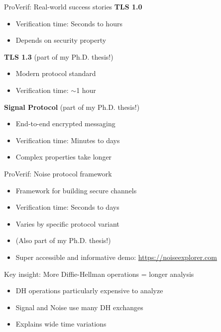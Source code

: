 \documentclass[aspectratio=169, lualatex, handout]{beamer}
\begin{document}
\begin{frame}{ProVerif: Real-world success stories}
	\textbf{TLS 1.0}
	\begin{itemize}
		\item Verification time: Seconds to hours
		\item Depends on security property
	\end{itemize}
	\vspace{0.5em}
	\textbf{TLS 1.3} (part of my Ph.D. thesis!)
	\begin{itemize}
		\item Modern protocol standard
		\item Verification time: $\sim$1 hour
	\end{itemize}
	\vspace{0.5em}
	\textbf{Signal Protocol} (part of my Ph.D. thesis!)
	\begin{itemize}
		\item End-to-end encrypted messaging
		\item Verification time: Minutes to days
		\item Complex properties take longer
	\end{itemize}
\end{frame}

\begin{frame}{ProVerif: Noise protocol framework}
	\begin{itemize}
		\item Framework for building secure channels
		\item Verification time: Seconds to days
		\item Varies by specific protocol variant
		\item (Also part of my Ph.D. thesis!)
		\item Super accessible and informative demo: \url{https://noiseexplorer.com}
	\end{itemize}
	\vspace{0.5em}
	\begin{center}
		\Large
		Key insight: More Diffie-Hellman operations = longer analysis
	\end{center}
	\vspace{0.5em}
	\begin{itemize}
		\item DH operations particularly expensive to analyze
		\item Signal and Noise use many DH exchanges
		\item Explains wide time variations
	\end{itemize}
\end{frame}
\end{document}
